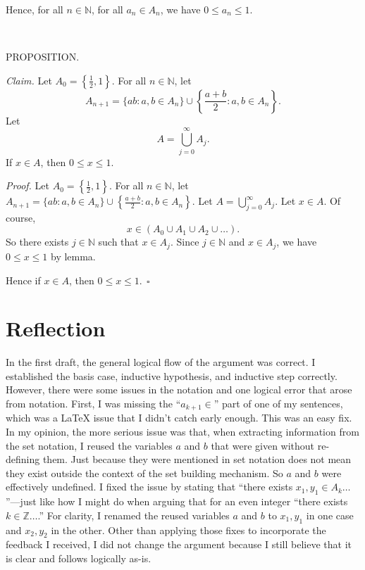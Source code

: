 \documentclass[9pt]{article}
\begin{document}
\noindent Hence, for all $n\in\mathbb{N}$, for all $a_n\in A_n$, we have $0\leq a_n\leq 1$.\newline

~\newline

\noindent\small{PROPOSITION.}\newline

\noindent\textit{Claim. }Let $A_0=\left\{\frac{1}{2},1
\right\}$. For all $n\in\mathbb{N}$, let
\[A_{n+1}=\{ab:a,b\in A_n\}\cup\left\{\frac{a+b}{2}:a,b\in A_n\right\}.\]
Let
\[A=\bigcup_{j=0}^{\infty}{A_j}.\]
If $x\in A$, then $0\leq x\leq 1$.\newline

\noindent\textit{Proof. }Let $A_0=\left\{\frac{1}{2},1
\right\}$. For all $n\in\mathbb{N}$, let $A_{n+1}=\{ab:a,b\in A_n\}\cup\left\{\frac{a+b}{2}:a,b\in A_n\right\}$. Let $A=\bigcup_{j=0}^{\infty}{A_j}$. Let $x\in A$. Of course,
\[x\in(A_0\cup A_1\cup A_2\cup\dots).\]
So there exists $j\in\mathbb{N}$ such that $x\in A_j$. Since $j\in\mathbb{N}$ and $x\in A_j$, we have $0\leq x\leq 1$ by lemma.\newline

\noindent Hence if $x\in A$, then $0\leq x\leq 1.~~\square$
\section*{Reflection}
In the first draft, the general logical flow of the argument was correct. I established the basis case, inductive hypothesis, and inductive step correctly. However, there were some issues in the notation and one logical error that arose from notation. First, I was missing the ``$a_{k+1}\in$'' part of one of my sentences, which was a \LaTeX{} issue that I didn't catch early enough. This was an easy fix. In my opinion, the more serious issue was that, when extracting information from the set notation, I reused the variables $a$ and $b$ that were given without re-defining them. Just because they were mentioned in set notation does not mean they exist outside the context of the set building mechanism. So $a$ and $b$ were effectively undefined. I fixed the issue by stating that ``there exists $x_1,y_1\in A_k\dots$''---just like how I might do when arguing that for an even integer ``there exists $k\in\mathbb{Z}\dots$.'' For clarity, I renamed the reused variables $a$ and $b$ to $x_1,y_1$ in one case and $x_2,y_2$ in the other. Other than applying those fixes to incorporate the feedback I received, I did not change the argument because I still believe that it is clear and follows logically as-is.
\end{document}
